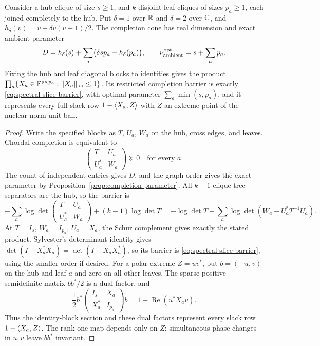 \begin{proposition}\label{prop:block-star}
Consider a hub clique of size $s\geq1$, and $k$ disjoint leaf cliques
of sizes $p_a\geq1$, each joined completely to the hub.  Put
$\delta=1$ over $\mathbb R$ and $\delta=2$ over $\mathbb C$, and
$h_\delta(v)=v+\delta v(v-1)/2$.
The completion cone has real dimension and exact ambient parameter
\begin{equation}\label{eq:block-star-ledger}
 D=h_\delta(s)+\sum_a\bigl(\delta sp_a+h_\delta(p_a)\bigr),
 \qquad \nu_{\rm ambient}^{\rm opt}=s+\sum_a p_a.
\end{equation}
Fixing the hub and leaf diagonal blocks to identities gives the product
$\prod_a\{X_a\in\mathbb F^{s\times p_a}:\lVert X_a\rVert_{\rm op}\leq1\}$.
Its restricted completion barrier is exactly
\eqref{eq:spectral-slice-barrier}, with optimal parameter
$\sum_a\min(s,p_a)$, and it represents every full slack row
$1-\langle X_a,Z\rangle$ with $Z$ an extreme point of the nuclear-norm unit ball.
\end{proposition}
\begin{proof}
Write the specified blocks as $T$, $U_a$, $W_a$ on the hub, cross edges,
and leaves.  Chordal completion is equivalent to
\[
 \begin{pmatrix}T&U_a\\U_a^*&W_a\end{pmatrix}\succeq0
 \quad\text{for every }a.
\]
The count of independent entries gives $D$, and the graph order gives
the exact parameter by Proposition~\ref{prop:completion-parameter}.
All $k-1$ clique-tree separators are the hub, so the barrier is
\begin{equation}\label{eq:star-barrier}
 -\sum_a\log\det\begin{pmatrix}T&U_a\\U_a^*&W_a\end{pmatrix}
       +(k-1)\log\det T
 =-\log\det T-\sum_a\log\det(W_a-U_a^*T^{-1}U_a).
\end{equation}
At $T=I_s$, $W_a=I_{p_a}$, $U_a=X_a$, the Schur complement gives
exactly the stated product.  Sylvester's determinant identity gives
$\det(I-X_a^*X_a)=\det(I-X_aX_a^*)$, so its barrier is
\eqref{eq:spectral-slice-barrier}, using the smaller order if desired.
For a polar extreme $Z=uv^*$, put $b=(-u,v)$ on the hub and leaf $a$
and zero on all other leaves.  The sparse positive-semidefinite matrix
$bb^*/2$ is a dual factor, and
\[
 \frac12 b^*\begin{pmatrix}I_s&X_a\\X_a^*&I_{p_a}\end{pmatrix}b
       =1-\operatorname{Re}(u^*X_av).
\]
Thus the identity-block section and these dual factors represent
every slack row $1-\langle X_a,Z\rangle$.  The rank-one map depends only on $Z$: simultaneous
phase changes in $u,v$ leave $bb^*$ invariant.
\end{proof}

